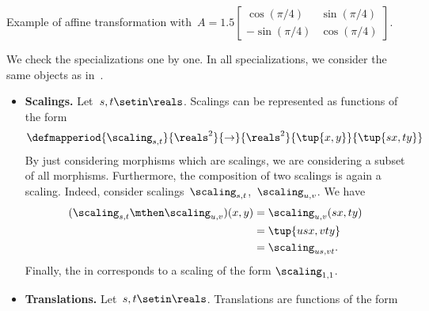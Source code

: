 \begin{solution}
    \begin{marginfigure}
        \begin{center}
        \end{center}
        \caption{Example of affine transformation with~$A=1.5\begin{bmatrix}
                    \cos(\pi/4) & \sin(\pi/4) \\-\sin(\pi/4)& \cos(\pi/4)
                \end{bmatrix}$.}
    \end{marginfigure}
    We check the specializations one by one.
    In all specializations, we consider the same objects as in~\Draw.
    \begin{itemize}
        \item \textbf{Scalings.}
              Let~$s,t\setin \reals$.
              Scalings can be represented as functions of the form
              \begin{equation}
                  \defmapperiod{
                      \scaling_{s,t}
                  }{
                      \reals^2
                  }{
                      \to
                  }{
                      \reals^2
                  }{
                      \tup{x,y}
                  }{
                      \tup{s x,t y}
                  }
              \end{equation}
              By just considering morphisms which are scalings, we are considering a subset of all morphisms.
              Furthermore, the composition of two scalings is again a scaling.
              Indeed, consider scalings~$\scaling_{s,t}$,~$\scaling_{u,v}$.
              We have
              \begin{equation}
                  \begin{aligned}
                      (\scaling_{s,t}\mthen \scaling_{u,v})(x,y)
                       & =\scaling_{u,v}(sx, ty) \\
                       & =\tup{usx, vty} \\
                       & =\scaling_{us,vt}.
                  \end{aligned}
              \end{equation}
              Finally, the  in \Draw corresponds to a scaling of the form $\scaling_{1,1}$.
        \item \textbf{Translations.}
              Let~$s,t\setin \reals$.
              Translations are functions of the form
              \begin{equation}

\end{equation}
\end{itemize}
\end{solution}

